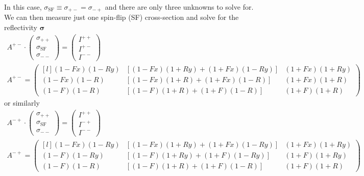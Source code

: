 \documentclass[12pt,letterpaper]{article}
\begin{document}
In this case, $\sigma_\textrm{SF} \equiv \sigma_{+-} = \sigma_{-+}$ and there are only three
unknowns to solve for.  We can then measure just one spin-flip (SF) cross-section and solve for
the reflectivity $\boldsymbol{\sigma}$
\begin{equation}
\begin{array}{c}
	A^{+-} \cdot 
	\begin{pmatrix}
	 	\sigma_{++} \\
	 	\sigma_\textrm{SF} \\
	 	\sigma_{--} 
	 \end{pmatrix}	 
	 = 
	 \begin{pmatrix}
		I^{++} \\
		I^{+-} \\
		I^{--} 
	\end{pmatrix}  \\[2em]

  A^{+-} = 
  \begin{pmatrix*}[l]
	(1-Fx)(1-Ry) &\!\!\! [(1-Fx)(1+Ry) + (1+Fx)(1-Ry)] &\!\!\! (1+Fx)(1+Ry) \\
	(1-Fx)(1-R) &\!\!\! [(1-Fx)(1+R) + (1+Fx)(1-R)] &\!\!\! (1+Fx)(1+R) \\
	(1-F)(1-R) &\!\!\! [(1-F)(1+R) + (1+F)(1-R)] &\!\!\! (1+F)(1+R) 
  \end{pmatrix*}
\end{array}
\end{equation}
or similarly
\begin{equation}
\begin{array}{c}
	A^{-+} \cdot 
	\begin{pmatrix}
	 	\sigma_{++} \\
	 	\sigma_\textrm{SF} \\
	 	\sigma_{--} 
	 \end{pmatrix}	 
	 = 
	 \begin{pmatrix}
		I^{++} \\
		I^{-+} \\
		I^{--} 
	\end{pmatrix}  \\[2em]

  A^{-+} = 
  \begin{pmatrix*}[l]
	(1-Fx)(1-Ry) &\!\!\! [(1-Fx)(1+Ry) + (1+Fx)(1-Ry)] &\!\!\! (1+Fx)(1+Ry) \\
	(1-F)(1-Ry) &\!\!\! [(1-F)(1+Ry) + (1+F)(1-Ry)] &\!\!\! (1+F)(1+Ry) \\
	(1-F)(1-R) &\!\!\! [(1-F)(1+R) + (1+F)(1-R)] &\!\!\! (1+F)(1+R) 
  \end{pmatrix*}
\end{array}
\end{equation}
\end{document}
